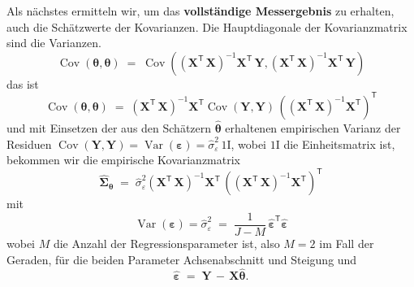 Als nächstes ermitteln wir, um das \textbf{vollständige	Messergebnis} zu erhalten,
auch die Schätz\-werte der Kovarianzen. Die Hauptdiagonale der Kovarianzmatrix sind die Varianzen.
\begin{equation}
\operatorname {Cov}( \boldsymbol{\theta},\boldsymbol{\theta} ) \; = \;
\operatorname {Cov}
\left(\left( \mathbf{X}^\mathsf{T}  \, \mathbf{X} \right)^{-1} \mathbf{X}^\mathsf{T} \, \mathbf{Y}, \left( \mathbf{X}^\mathsf{T}  \, \mathbf{X} \right)^{-1} \mathbf{X}^\mathsf{T} \, \mathbf{Y}\right)
\label{eq:COVRegressionsparameter}
\end{equation}
das ist
\begin{equation}
\operatorname {Cov}( \boldsymbol{\theta}, \boldsymbol{\theta} ) \; = \;
\left( \mathbf{X}^\mathsf{T}  \, \mathbf{X} \right)^{-1} \mathbf{X}^\mathsf{T} \operatorname {Cov} (\mathbf{Y}, \mathbf{Y}) \, \left( \left( \mathbf{X}^\mathsf{T}  \, \mathbf{X} \right)^{-1} \mathbf{X}^\mathsf{T} \right)^\mathsf{T}
\end{equation}
und mit Einsetzen der aus den Schätzern $\boldsymbol{\hat \theta}$ erhaltenen
empirischen Varianz der Residuen
$\operatorname {Cov} (\mathbf{Y}, \mathbf{Y}) = \operatorname {Var} (\mathbf{\varepsilon}) = \hat \sigma_{\varepsilon}^2 \, 1 \! \mathrm{I}$, wobei $1 \! \mathrm{I}$ die  Einheitsmatrix ist, 
bekommen wir die empirische Kovarianzmatrix
\begin{equation}
\boldsymbol{\hat \Sigma}_{\boldsymbol{\theta}} \; = \;
\hat \sigma_{\varepsilon}^2
\left( \mathbf{X}^\mathsf{T}  \, \mathbf{X} \right)^{-1} \mathbf{X}^\mathsf{T} \, \left( \left( \mathbf{X}^\mathsf{T}  \, \mathbf{X} \right)^{-1} \mathbf{X}^\mathsf{T} \right)^\mathsf{T}
\label{linRegempirKovarianz}
\end{equation}
mit
$$
\operatorname {Var} (\mathbf{\varepsilon}) = \hat \sigma_{\varepsilon}^2 \; = \;
\frac{1}{J-M} \, \boldsymbol{\hat \varepsilon}^\mathsf{T} \boldsymbol{\hat \varepsilon}
$$
wobei $M$ die Anzahl der Regressionsparameter ist, also $M = 2$ im Fall der Geraden, für die beiden Parameter Achsenabschnitt und Steigung und
$$
\boldsymbol{\hat \varepsilon} \; = \; \mathbf{Y} \, - \, \mathbf{X} \boldsymbol{\hat \theta} .
$$

